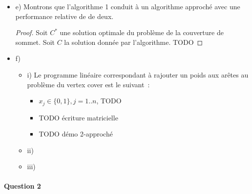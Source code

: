 \documentclass[a4paper, 12pt]{article}
\begin{document}
\begin{itemize}
\begin{itemize}
\begin{proof}
d'où $\neg (x_r < \frac{1}{2} \wedge x_s < \frac{1}{2})$, et donc
($x_r \geq \frac{1}{2} \vee x_s \geq \frac{1}{2}) $ de par la loi de
De Morgan.
\end{proof}
\item Deuxième démonstration.
\begin{proof}
On sait que $A \Rightarrow B \equiv \neg A \vee B$. 
Or, pour respecter l'inégalité $x_r + x_s \geq 1$, on a $(x_r <
\frac{1}{2} \Rightarrow x_s \geq \frac{1}{2})$. On a ainsi $(x_r \geq
\frac{1}{2} \vee x_s \geq \frac{1}{2})$. 
\end{proof}
\end{itemize}
\item[] e) Montrons que l'algorithme 1 conduit à un algorithme
  approché avec une performance relative de de deux. 
\begin{proof}
Soit $C^{*}$ une solution optimale du problème de la couverture de
sommet. Soit $C$ la solution donnée par l'algorithme. 
TODO
\end{proof}
\item[] f)
\begin{itemize}
\item i)
Le programme linéaire correspondant à rajouter un poids aux arêtes au
problème du vertex cover est le suivant~:
\begin{itemize}
\item  $x_j \in \{0,1\}, j=1..n$,  TODO
\item TODO écriture matricielle
\item TODO démo 2-approché
\end{itemize}
\item ii)
\item iii)
\end{itemize}
\end{itemize}

\paragraph{Question 2}
\end{document}
